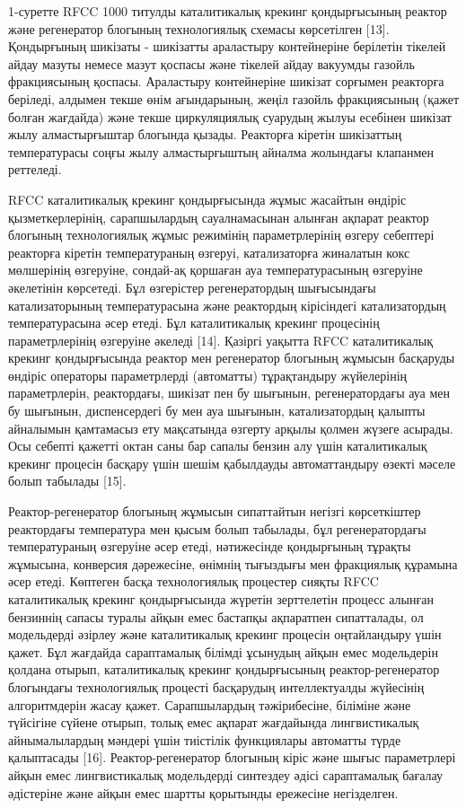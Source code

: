 \begin{multicols}{2}
1-суретте RFCC 1000 титулды каталитикалық крекинг қондырғысының реактор
және регенератор блогының технологиялық схемасы көрсетілген {[}13{]}.
Қондырғының шикізаты - шикізатты араластыру контейнеріне берілетін
тікелей айдау мазуты немесе мазут қоспасы және тікелей айдау вакуумды
газойль фракциясының қоспасы. Араластыру контейнеріне шикізат сорғымен
реакторға беріледі, алдымен текше өнім ағындарының, жеңіл газойль
фракциясының (қажет болған жағдайда) және текше циркуляциялық суарудың
жылуы есебінен шикізат жылу алмастырғыштар блогында қызады. Реакторға
кіретін шикізаттың температурасы соңғы жылу алмастырғыштың айналма
жолындағы клапанмен реттеледі.

RFCC каталитикалық крекинг қондырғысында жұмыс жасайтын өндіріс
қызметкерлерінің, сарапшылардың сауалнамасынан алынған ақпарат реактор
блогының технологиялық жұмыс режимінің параметрлерінің өзгеру себептері
реакторға кіретін температураның өзгеруі, катализаторға жиналатын кокс
мөлшерінің өзгеруіне, сондай-ақ қоршаған ауа температурасының өзгеруіне
әкелетінін көрсетеді. Бұл өзгерістер регенератордың шығысындағы
катализаторының температурасына және реактордың кірісіндегі
катализатордың температурасына әсер етеді. Бұл каталитикалық крекинг
процесінің параметрлерінің өзгеруіне әкеледі {[}14{]}. Қазіргі уақытта
RFCC каталитикалық крекинг қондырғысында реактор мен регенератор
блогының жұмысын басқаруды өндіріс операторы параметрлерді (автоматты)
тұрақтандыру жүйелерінің параметрлерін, реактордағы, шикізат пен бу
шығынын, регенератордағы ауа мен бу шығынын, диспенсердегі бу мен ауа
шығынын, катализатордың қалыпты айналымын қамтамасыз ету мақсатында
өзгерту арқылы қолмен жүзеге асырады. Осы себепті қажетті октан саны бар
сапалы бензин алу үшін каталитикалық крекинг процесін басқару үшін шешім
қабылдауды автоматтандыру өзекті мәселе болып табылады {[}15{]}.

Реактор-регенератор блогының жұмысын сипаттайтын негізгі көрсеткіштер
реактордағы температура мен қысым болып табылады, бұл регенератордағы
температураның өзгеруіне әсер етеді, нәтижесінде қондырғының тұрақты
жұмысына, конверсия дәрежесіне, өнімнің тығыздығы мен фракциялық
құрамына әсер етеді. Көптеген басқа технологиялық процестер сияқты RFCC
каталитикалық крекинг қондырғысында жүретін зерттелетін процесс алынған
бензиннің сапасы туралы айқын емес бастапқы ақпаратпен сипатталады, ол
модельдерді әзірлеу және каталитикалық крекинг процесін оңтайландыру
үшін қажет. Бұл жағдайда сараптамалық білімді ұсынудың айқын емес
модельдерін қолдана отырып, каталитикалық крекинг қондырғысының
реактор-регенератор блогындағы технологиялық процесті басқарудың
интеллектуалды жүйесінің алгоритмдерін жасау қажет. Сарапшылардың
тәжірибесіне, біліміне және түйсігіне сүйене отырып, толық емес ақпарат
жағдайында лингвистикалық айнымалылардың мәндері үшін тиістілік
функциялары автоматты түрде қалыптасады {[}16{]}. Реактор-регенератор
блогының кіріс және шығыс параметрлері айқын емес лингвистикалық
модельдерді синтездеу әдісі сараптамалық бағалау әдістеріне және айқын
емес шартты қорытынды ережесіне негізделген.


\end{multicols}

